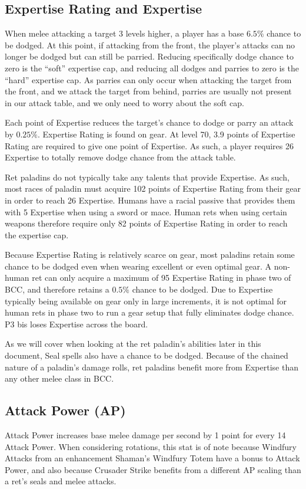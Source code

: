 \documentclass[letterpaper,11pt]{article}
\begin{document}
	\subsection{Expertise Rating and Expertise}
	When melee attacking a target 3 levels higher, a player has a base $6.5\%$ chance to be dodged.
	At this point, if attacking from the front, the player's attacks can no longer be dodged but can still be parried.
	Reducing specifically dodge chance to zero is the ``soft'' expertise cap, and reducing all dodges and parries to zero is the ``hard'' expertise cap.
	As parries can only occur when attacking the target from the front, and we attack the target from behind, parries are usually not present in our attack table, and we only need to worry about the soft cap.

	Each point of Expertise reduces the target's chance to dodge or parry an attack by $0.25\%$.
	Expertise Rating is found on gear.
	At level 70, 3.9 points of Expertise Rating are required to give one point of Expertise.
	As such, a player requires 26 Expertise to totally remove dodge chance from the attack table.
	
	Ret paladins do not typically take any talents that provide Expertise.
	As such, most races of paladin must acquire 102 points of Expertise Rating from their gear in order to reach 26 Expertise.
	Humans have a racial passive that provides them with 5 Expertise when using a sword or mace.
	Human rets when using certain weapons therefore require only 82 points of Expertise Rating in order to reach the expertise cap.
	
	Because Expertise Rating is relatively scarce on gear, most paladins retain some chance to be dodged even when wearing excellent or even optimal gear.
	A non-human ret can only acquire a maximum of 95 Expertise Rating in phase two of BCC, and therefore retains a $0.5\%$ chance to be dodged.
	Due to Expertise typically being available on gear only in large increments, it is not optimal for human rets in phase two to run a gear setup that fully eliminates dodge chance.
	P3 bis loses Expertise across the board.

	As we will cover when looking at the ret paladin's abilities later in this document, Seal spells also have a chance to be dodged.
	Because of the chained nature of a paladin's damage rolls, ret paladins benefit more from Expertise than any other melee class in BCC.
	
	\subsection{Attack Power (AP)}
	Attack Power increases base melee damage per second by 1 point for every 14 Attack Power.
	When considering rotations, this stat is of note because Windfury Attacks from an enhancement Shaman's Windfury Totem have a bonus to Attack Power, and also because Crusader Strike benefits from a different AP scaling than a ret's seals and melee attacks.
	
\end{document}
